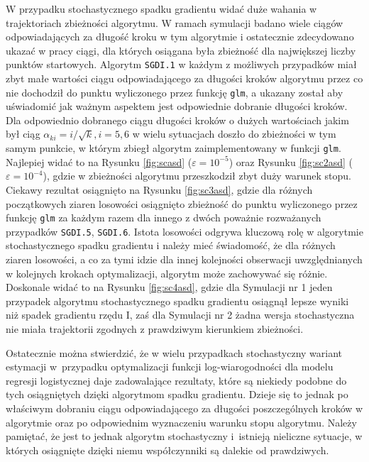 W przypadku stochastycznego spadku gradientu widać duże wahania w trajektoriach zbieżności algorytmu. W ramach symulacji badano wiele ciągów odpowiadających za długość kroku w tym algorytmie i ostatecznie zdecydowano ukazać w pracy ciągi, dla których osiągana była zbieżność dla największej liczby punktów startowych. Algorytm \texttt{SGDI.1} w każdym z możliwych przypadków miał zbyt małe wartości ciągu odpowiadającego za długości kroków algorytmu przez co nie dochodził do punktu wyliczonego przez funkcję \texttt{glm}, a ukazany został aby uświadomić jak ważnym aspektem jest odpowiednie dobranie długości kroków. Dla odpowiednio dobranego ciągu długości kroków o dużych wartościach jakim był ciąg $\alpha_{ki} = i/\sqrt{k}, i = 5, 6$ w wielu sytuacjach doszło do zbieżności w tym samym punkcie, w którym zbiegł algorytm zaimplementowany w funkcji \texttt{glm}. Najlepiej widać to na Rysunku \ref{fig:scasd} ($\varepsilon = 10^{-5}$) oraz Rysunku \ref{fig:sc2asd} ($\varepsilon = 10^{-4}$), gdzie w zbieżności algorytmu przeszkodził zbyt duży warunek stopu. Ciekawy rezultat osiągnięto na Rysunku \ref{fig:sc3asd}, gdzie dla różnych początkowych ziaren losowości osiągnięto zbieżność do punktu wyliczonego przez funkcję \texttt{glm} za każdym razem dla innego z dwóch poważnie rozważanych przypadków \texttt{SGDI.5}, \texttt{SGDI.6}. Istota losowości odgrywa kluczową rolę w algorytmie stochastycznego spadku gradientu i należy mieć świadomość, że dla różnych ziaren losowości, a co za tymi idzie dla innej kolejności obserwacji uwzględnianych w kolejnych krokach optymalizacji, algorytm może zachowywać się różnie. Doskonale widać to na Rysunku \ref{fig:sc4asd}, gdzie dla Symulacji nr 1 jeden przypadek algorytmu stochastycznego spadku gradientu osiągnął lepsze wyniki niż spadek gradientu rzędu I, zaś dla Symulacji nr 2 żadna wersja stochastyczna nie miała trajektorii zgodnych z prawdziwym kierunkiem zbieżności.

Ostatecznie można stwierdzić, że w wielu przypadkach stochastyczny wariant estymacji w~przypadku optymalizacji funkcji log-wiarogodności dla modelu regresji logistycznej daje zadowalające rezultaty, które są niekiedy podobne do tych osiągniętych dzięki algorytmom spadku gradientu. Dzieje się to jednak po właściwym dobraniu ciągu odpowiadającego za długości poszczególnych kroków w algorytmie oraz po odpowiednim wyznaczeniu warunku stopu algorytmu. Należy pamiętać, że jest to jednak algorytm stochastyczny i~istnieją nieliczne sytuacje, w których osiągnięte dzięki niemu współczynniki są dalekie od prawdziwych.



